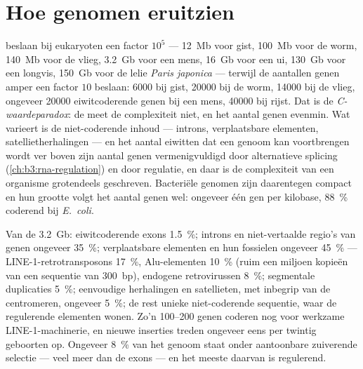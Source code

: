 \section{Hoe genomen eruitzien}

\begin{proposition}\label{prop:b3:genomics:sizes}
 beslaan bij eukaryoten een factor $10^{5}$ ---
\qty{12}{Mb} voor gist, \qty{100}{Mb} voor de worm, \qty{140}{Mb} voor
de vlieg, \qty{3.2}{Gb} voor een mens, \qty{16}{Gb} voor een ui,
\qty{130}{Gb} voor een longvis, \qty{150}{Gb} voor de lelie \emph{Paris
japonica} --- terwijl de aantallen genen amper een factor $10$
beslaan: \num{6000} bij gist, \num{20000} bij de worm, \num{14000} bij
de vlieg, ongeveer \num{20000} eiwitcoderende genen bij een mens,
\num{40000} bij rijst. Dat is de \emph{C-waardeparadox}: de
 meet de complexiteit niet, en het aantal genen evenmin.
Wat varieert is de niet-coderende inhoud --- introns, verplaatsbare
elementen, satellietherhalingen --- en het aantal eiwitten dat een
genoom kan voortbrengen wordt ver boven zijn aantal genen
vermenigvuldigd door alternatieve splicing
(\cref{ch:b3:rna-regulation}) en door regulatie, en daar is de
complexiteit van een organisme grotendeels geschreven. Bacteriële
genomen zijn daarentegen compact en hun grootte volgt het aantal genen
wel: ongeveer één gen per kilobase, \qty{88}{\%} coderend bij
\emph{E.~coli}.
\end{proposition}

\begin{example}\label{ex:b3:genomics:content}
Van de \qty{3.2}{Gb}: eiwitcoderende exons \qty{1.5}{\%}; introns en
niet-vertaalde regio's van genen ongeveer \qty{35}{\%}; verplaatsbare
elementen en hun fossielen ongeveer \qty{45}{\%} ---
LINE-1-retrotransposons \qty{17}{\%}, Alu-elementen \qty{10}{\%} (ruim
een miljoen kopieën van een sequentie van \qty{300}{bp}), endogene
retrovirussen \qty{8}{\%}; segmentale duplicaties \qty{5}{\%};
eenvoudige herhalingen en satellieten, met inbegrip van de centromeren,
ongeveer \qty{5}{\%}; de rest unieke niet-coderende sequentie, waar de
regulerende elementen wonen. Zo'n \numrange{100}{200} genen coderen nog
voor werkzame LINE-1-machinerie, en nieuwe inserties treden ongeveer
eens per twintig geboorten op. Ongeveer \qty{8}{\%} van het genoom
staat onder aantoonbare zuiverende selectie --- veel meer dan de exons
--- en het meeste daarvan is regulerend.
\end{example}

